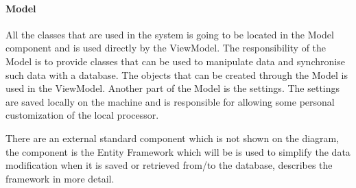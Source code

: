 \paragraph{Model}
All the classes that are used in the system is going to be located in the Model component and is used directly by the ViewModel. The responsibility of the Model is to provide classes that can be used to manipulate data and synchronise such data with a database. The objects that can be created through the Model is used in the ViewModel. Another part of the Model is the settings. The settings are saved locally on the machine and is responsible for allowing some personal customization of the local processor.

There are an external standard component which is not shown on the diagram, the component is the Entity Framework which will be is used to simplify the data modification when it is saved or retrieved from/to the database,  describes the framework in more detail.